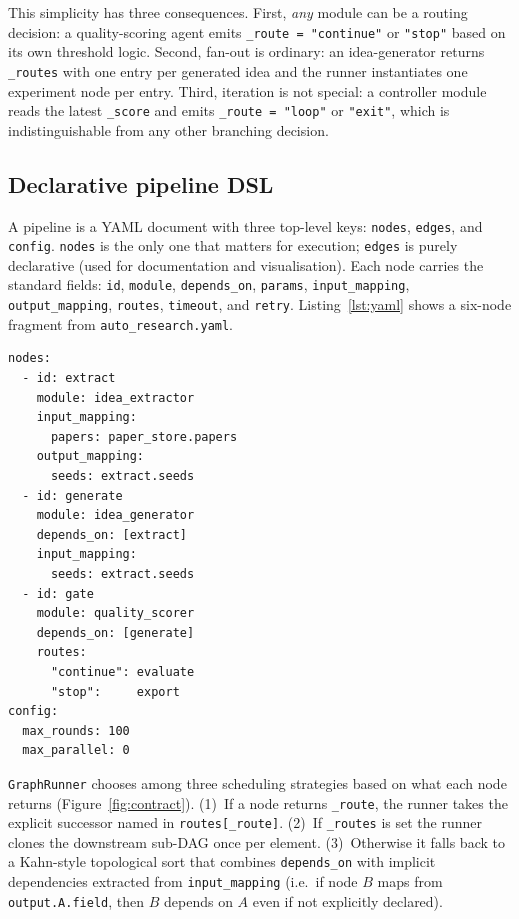 \documentclass{article}
\newcommand{\code}[1]{\texttt{\small #1}}
\begin{document}
This simplicity has three consequences. First, \emph{any} module can be a
routing decision: a quality-scoring agent emits
\code{\_route = "continue"} or \code{"stop"} based on its own threshold
logic. Second, fan-out is ordinary: an idea-generator returns
\code{\_routes} with one entry per generated idea and the runner
instantiates one experiment node per entry. Third, iteration is not
special: a controller module reads the latest \code{\_score} and emits
\code{\_route = "loop"} or \code{"exit"}, which is indistinguishable from
any other branching decision.

\subsection{Declarative pipeline DSL}
\label{sec:dag}

A pipeline is a YAML document with three top-level keys: \code{nodes},
\code{edges}, and \code{config}. \code{nodes} is the only one that
matters for execution; \code{edges} is purely declarative (used for
documentation and visualisation). Each node carries the standard fields:
\code{id}, \code{module}, \code{depends\_on}, \code{params},
\code{input\_mapping}, \code{output\_mapping}, \code{routes},
\code{timeout}, and \code{retry}. Listing~\ref{lst:yaml} shows a six-node
fragment from \code{auto\_research.yaml}.

\begin{lstlisting}[caption={Pipeline fragment showing node + adapter wiring}, label={lst:yaml}]
nodes:
  - id: extract
    module: idea_extractor
    input_mapping:
      papers: paper_store.papers
    output_mapping:
      seeds: extract.seeds
  - id: generate
    module: idea_generator
    depends_on: [extract]
    input_mapping:
      seeds: extract.seeds
  - id: gate
    module: quality_scorer
    depends_on: [generate]
    routes:
      "continue": evaluate
      "stop":     export
config:
  max_rounds: 100
  max_parallel: 0
\end{lstlisting}

\code{GraphRunner} chooses among three scheduling strategies based on
what each node returns (Figure~\ref{fig:contract}).
(1)~If a node returns \code{\_route}, the runner takes the explicit
successor named in \code{routes[\_route]}.
(2)~If \code{\_routes} is set the runner clones the downstream sub-DAG
once per element. (3)~Otherwise it falls back to a Kahn-style
topological sort that combines \code{depends\_on} with implicit
dependencies extracted from \code{input\_mapping} (i.e.\ if node $B$
maps from \code{output.A.field}, then $B$ depends on $A$ even if not
explicitly declared).
\end{document}
